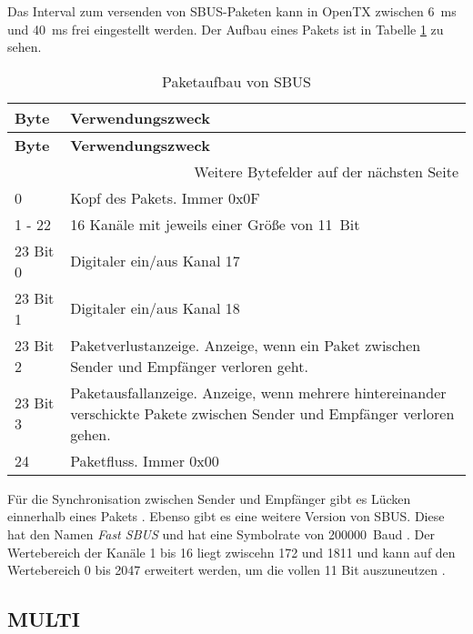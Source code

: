 Das Interval zum versenden von SBUS-Paketen kann in OpenTX zwischen 6~ms und 40~ms frei eingestellt werden. Der Aufbau eines Pakets ist in Tabelle \ref{table:sbusPaket} zu sehen.

\begin{longtable}[c]{|p{3cm}|p{12cm}|}
    \caption{Paketaufbau von SBUS \cite{BolderFlight}}
    \label{table:sbusPaket}\\
    \hline
    \textbf{Byte} & \textbf{Verwendungszweck}\\
    \hline
    \hline
    \endfirsthead

    \hline
    \textbf{Byte} & \textbf{Verwendungszweck}\\
    \hline
    \hline
    \endhead

    \hline
    \multicolumn{2}{|r|}{Weitere Bytefelder auf der nächsten Seite}\\
    \hline
    \endfoot

    \hline
    \endlastfoot
    
    0 & Kopf des Pakets. Immer 0x0F \\
    \hline
    1 - 22 & 16 Kanäle mit jeweils einer Größe von 11~Bit \\
    \hline
    23 Bit 0 & Digitaler ein/aus Kanal 17 \\
    \hline
    23 Bit 1 & Digitaler ein/aus Kanal 18 \\
    \hline
    23 Bit 2 & Paketverlustanzeige. Anzeige, wenn ein Paket zwischen Sender und Empfänger verloren geht. \\
    \hline
    23 Bit 3 & Paketausfallanzeige. Anzeige, wenn mehrere hintereinander verschickte Pakete zwischen Sender und Empfänger verloren gehen. \\
    \hline
    24 & Paketfluss. Immer 0x00 \cite{sigrokSBus} \\
\end{longtable}

Für die Synchronisation zwischen Sender und Empfänger gibt es Lücken einnerhalb eines Pakets \cite{sigrokSBus}. Ebenso gibt es eine weitere Version von SBUS. Diese hat den Namen \textit{Fast SBUS} und hat eine Symbolrate von 200000~Baud \cite{BolderFlight}. Der Wertebereich der Kanäle 1 bis 16 liegt zwiscehn 172 und 1811 und kann auf den Wertebereich 0 bis 2047 erweitert werden, um die vollen 11 Bit auszuneutzen \cite{BolderFlight}. 

\subsection{MULTI}

